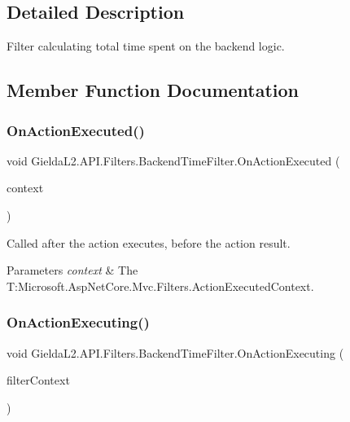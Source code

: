 \subsection{Detailed Description}
Filter calculating total time spent on the backend logic. 



\subsection{Member Function Documentation}
\mbox{\label{class_gielda_l2_1_1_a_p_i_1_1_filters_1_1_backend_time_filter_a5764fd9d5044d1853faff5c8e002203f}} 
\subsubsection{\texorpdfstring{OnActionExecuted()}{OnActionExecuted()}}
{\footnotesize\ttfamily void Gielda\+L2.\+A\+P\+I.\+Filters.\+Backend\+Time\+Filter.\+On\+Action\+Executed (\begin{DoxyParamCaption}\item[{Action\+Executed\+Context}]{context }\end{DoxyParamCaption})}



Called after the action executes, before the action result. 


\begin{DoxyParams}{Parameters}
{\em context} & The T\+:\+Microsoft.\+Asp\+Net\+Core.\+Mvc.\+Filters.\+Action\+Executed\+Context.\\
\hline
\end{DoxyParams}
\mbox{\label{class_gielda_l2_1_1_a_p_i_1_1_filters_1_1_backend_time_filter_a574dadcdcdbee12457c072577873497b}} 
\subsubsection{\texorpdfstring{OnActionExecuting()}{OnActionExecuting()}}
{\footnotesize\ttfamily void Gielda\+L2.\+A\+P\+I.\+Filters.\+Backend\+Time\+Filter.\+On\+Action\+Executing (\begin{DoxyParamCaption}\item[{Action\+Executing\+Context}]{filter\+Context }\end{DoxyParamCaption})}



